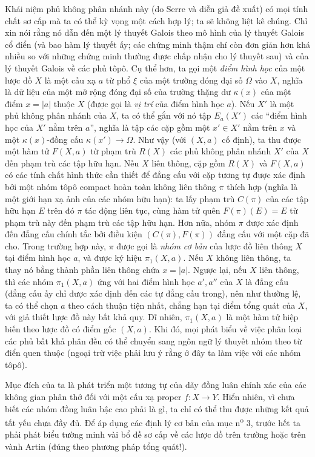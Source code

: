 Khái niệm phủ không phân nhánh này (do Serre và diễn giả đề xuất) có mọi tính
chất sơ cấp mà ta có thể kỳ vọng một cách hợp lý; ta sẽ không liệt kê chúng.
Chỉ xin nói rằng nó dẫn đến một lý thuyết Galois theo mô hình của lý thuyết
Galois cổ điển (và bao hàm lý thuyết ấy; các chứng minh thậm chí còn đơn giản
hơn khá nhiều so với những chứng minh thường được chấp nhận cho lý thuyết sau) và của lý thuyết
Galois về các phủ tôpô. Cụ thể hơn, ta gọi một \emph{điểm hình học} của một
lược đồ $X$ là một cấu xạ $a$ từ phổ $\xi$ của một trường đóng đại số $\Omega$
vào $X$, nghĩa là dữ liệu của một mở rộng đóng đại số của trường thặng dư
$\kappa(x)$ của một điểm $x=|a|$ thuộc $X$ (được gọi là \emph{vị trí} của
điểm hình học $a$). Nếu $X'$ là một phủ không phân nhánh của $X$, ta có thể
gắn với nó tập $E_a(X')$ các “điểm hình học của $X'$ nằm trên $a$”, nghĩa là
tập các cặp gồm một $x'\in X'$ nằm trên $x$ và một $\kappa(x)$-đồng cấu
$\kappa(x')\longrightarrow\Omega$. Như vậy (với $(X,a)$ cố định), ta thu được
một hàm tử $F(X,a)$ từ phạm trù $R(X)$ các phủ không phân nhánh $X'$ của $X$
đến phạm trù các tập hữu hạn. Nếu $X$ liên thông, cặp gồm $R(X)$ và $F(X,a)$
có các tính chất hình thức cần thiết để đẳng cấu với cặp tương tự được xác định
bởi một nhóm tôpô compact hoàn toàn không liên thông $\pi$ thích hợp (nghĩa là
một giới hạn xạ ảnh của các nhóm hữu hạn): ta lấy phạm trù $C(\pi)$ của các tập
hữu hạn $E$ trên đó $\pi$ tác động liên tục, cùng hàm tử quên
$F(\pi)(E)=E$ từ phạm trù này đến phạm trù các tập hữu hạn. Hơn nữa, nhóm
$\pi$ được xác định đến đẳng cấu chính tắc bởi điều kiện $(C(\pi),F(\pi))$
đẳng cấu với một cặp đã cho. Trong trường hợp này, $\pi$ được gọi là
\emph{nhóm cơ bản} của lược đồ liên thông $X$ tại điểm hình học $a$, và được
ký hiệu $\pi_1(X,a)$. Nếu $X$ không liên thông, ta thay nó bằng thành phần liên
thông chứa $x=|a|$. Ngược lại, nếu $X$ liên thông, thì các nhóm $\pi_1(X,a)$
ứng với hai điểm hình học $a',a''$ của $X$ là đẳng cấu (đẳng cấu ấy chỉ được
xác định đến các tự đẳng cấu trong), nên như thường lệ, ta có thể chọn $a$
theo cách thuận tiện nhất, chẳng hạn tại điểm tổng quát của $X$, với giả thiết
lược đồ này bất khả quy. Dĩ nhiên, $\pi_1(X,a)$ là một hàm tử hiệp biến theo lược
đồ có điểm gốc $(X,a)$. Khi đó, mọi phát biểu về việc phân loại các phủ bất
khả phân đều có thể chuyển sang ngôn ngữ lý thuyết nhóm theo từ điển quen thuộc
(ngoại trừ việc phải lưu ý rằng ở đây ta làm việc với các nhóm tôpô).

Mục đích của ta là phát triển một tương tự của dãy đồng luân chính xác của các
không gian phân thớ đối với một cấu xạ proper $f:X\longrightarrow Y$. Hiển
nhiên, vì chưa biết các nhóm đồng luân bậc cao phải là gì, ta chỉ có thể thu
được những kết quả tất yếu chưa đầy đủ. Để áp dụng các định lý cơ bản của
mục n\textsuperscript{o} 3, trước hết ta phải phát biểu tường minh vài bổ đề sơ cấp về các lược đồ
trên trường hoặc trên vành Artin (đúng theo phương pháp tổng quát!).

